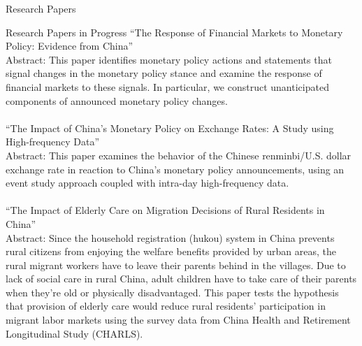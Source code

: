 \documentclass{resume} %
\begin{document}
\begin{rSection}{Research Papers}
\end{rSection}
\bigskip \bigskip




\begin{rSection}{Research Papers in Progress}
``The Response of Financial Markets to Monetary Policy: Evidence from China''\\
Abstract: This paper identifies monetary policy actions and statements that signal changes in the monetary policy
stance and examine the response of financial markets to these signals. In particular, we construct unanticipated components of announced monetary policy changes.
\\
\\``The Impact of China's Monetary Policy on Exchange Rates: A Study using High-frequency Data''\\
Abstract: This paper examines the behavior of the Chinese renminbi/U.S. dollar exchange rate in reaction to China's monetary policy announcements, using an event study approach coupled with intra-day high-frequency data.
\\
\\
``The Impact of Elderly Care on Migration Decisions of Rural Residents in China''
\\
Abstract: Since the household registration (hukou) system in China prevents rural citizens from enjoying the welfare benefits provided by urban areas, the rural migrant workers have to leave their parents behind in the villages. Due to lack of social care in rural China, adult children have to take care of their parents when they’re old or physically disadvantaged. This paper tests the hypothesis that provision of elderly care would reduce rural residents' participation in migrant labor markets using the survey data from China Health and Retirement Longitudinal Study (CHARLS). 
	

\end{rSection}
\bigskip \bigskip
\end{document}
